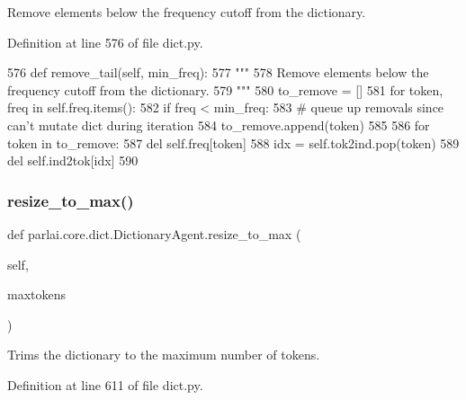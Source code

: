 \begin{DoxyVerb}Remove elements below the frequency cutoff from the dictionary.
\end{DoxyVerb}
 

Definition at line 576 of file dict.\+py.


\begin{DoxyCode}
576     \textcolor{keyword}{def }remove\_tail(self, min\_freq):
577         \textcolor{stringliteral}{"""}
578 \textcolor{stringliteral}{        Remove elements below the frequency cutoff from the dictionary.}
579 \textcolor{stringliteral}{        """}
580         to\_remove = []
581         \textcolor{keywordflow}{for} token, freq \textcolor{keywordflow}{in} self.freq.items():
582             \textcolor{keywordflow}{if} freq < min\_freq:
583                 \textcolor{comment}{# queue up removals since can't mutate dict during iteration}
584                 to\_remove.append(token)
585 
586         \textcolor{keywordflow}{for} token \textcolor{keywordflow}{in} to\_remove:
587             del self.freq[token]
588             idx = self.tok2ind.pop(token)
589             del self.ind2tok[idx]
590 
\end{DoxyCode}
\mbox{\label{classparlai_1_1core_1_1dict_1_1DictionaryAgent_a1a800c1aecdb97986c59fd26f1b55626}} 
\subsubsection{\texorpdfstring{resize\+\_\+to\+\_\+max()}{resize\_to\_max()}}
{\footnotesize\ttfamily def parlai.\+core.\+dict.\+Dictionary\+Agent.\+resize\+\_\+to\+\_\+max (\begin{DoxyParamCaption}\item[{}]{self,  }\item[{}]{maxtokens }\end{DoxyParamCaption})}

\begin{DoxyVerb}Trims the dictionary to the maximum number of tokens.
\end{DoxyVerb}
 

Definition at line 611 of file dict.\+py.


